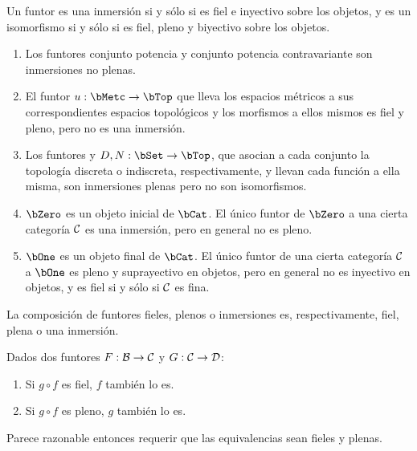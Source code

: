 \begin{proposition}
  Un funtor es una inmersión si y sólo si es fiel e inyectivo sobre los objetos,
  y es un isomorfismo si y sólo si es fiel, pleno y biyectivo sobre los objetos.
\end{proposition}

\begin{example}\;
  \begin{enumerate}
  \item Los funtores conjunto potencia y conjunto potencia contravariante son
    inmersiones no plenas.
  \item El funtor $u:\bMetc\to\bTop$ que lleva los espacios métricos a sus
    correspondientes espacios topológicos y los morfismos a ellos mismos es fiel
    y pleno, pero no es una inmersión.
  \item Los funtores  y 
    $D,N:\bSet\to\bTop$, que asocian a cada conjunto la topología discreta o
    indiscreta, respectivamente, y llevan cada función a ella misma, son
    inmersiones plenas pero no son isomorfismos.
  \item $\bZero$ es un objeto inicial de $\bCat$. El único funtor de $\bZero$ a
    una cierta categoría $\mathcal{C}$ es una inmersión, pero en general no es pleno.
  \item $\bOne$ es un objeto final de $\bCat$. El único funtor de una cierta
    categoría $\mathcal{C}$ a $\bOne$ es pleno y suprayectivo en objetos, pero en
    general no es inyectivo en objetos, y es fiel si y sólo si $\mathcal{C}$ es fina.
  \end{enumerate}
\end{example}

\begin{proposition}
  \label{prop:compose-faith}
  La composición de funtores fieles, plenos o inmersiones es, respectivamente,
  fiel, plena o una inmersión.
\end{proposition}

\begin{proposition}
  Dados dos funtores $F:\mathcal{B}\to\mathcal{C}$ y $G:\mathcal{C}\to\mathcal{D}$:
  \begin{enumerate}
  \item Si $g\circ f$ es fiel, $f$ también lo es.
  \item Si $g\circ f$ es pleno, $g$ también lo es.
  \end{enumerate}
\end{proposition}

Parece razonable entonces requerir que las equivalencias sean fieles y plenas.

